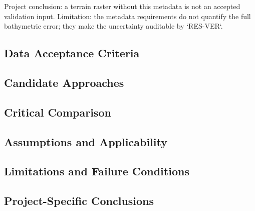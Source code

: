 Project conclusion: a terrain raster without this metadata is not an
accepted validation input. Limitation: the metadata requirements do not
quantify the full bathymetric error; they make the uncertainty
auditable by `RES-VER`.

\subsection{Data Acceptance Criteria}
\label{sec:res-dat-geo-data-acceptance-criteria}


\subsection{Candidate Approaches}
\label{sec:res-dat-geo-candidate-approaches}


\subsection{Critical Comparison}
\label{sec:res-dat-geo-critical-comparison}


\subsection{Assumptions and Applicability}
\label{sec:res-dat-geo-assumptions}


\subsection{Limitations and Failure Conditions}
\label{sec:res-dat-geo-limitations}


\subsection{Project-Specific Conclusions}
\label{sec:res-dat-geo-conclusions}

